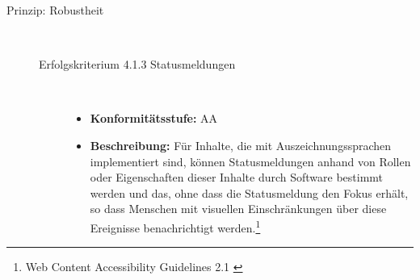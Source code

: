 \begin{description}
	\item[Prinzip: Robustheit]\hfill \\
	\begin{description}
		\item [Erfolgskriterium 4.1.3 Statusmeldungen]\hfill \\
		\begin{itemize}
			\item \textbf{Konformitätsstufe:} AA
			\item \textbf{Beschreibung:} Für Inhalte, die mit Auszeichnungssprachen implementiert sind, können Statusmeldungen anhand von Rollen oder Eigenschaften dieser Inhalte 
			durch Software bestimmt werden und das, ohne dass die Statusmeldung den Fokus erhält, so dass Menschen mit visuellen Einschränkungen über diese Ereignisse benachrichtigt 
			werden.\footnote{Web Content Accessibility Guidelines 2.1 \cite{WCAG2.1}}
		\end{itemize}
	\end{description}
\end{description}
